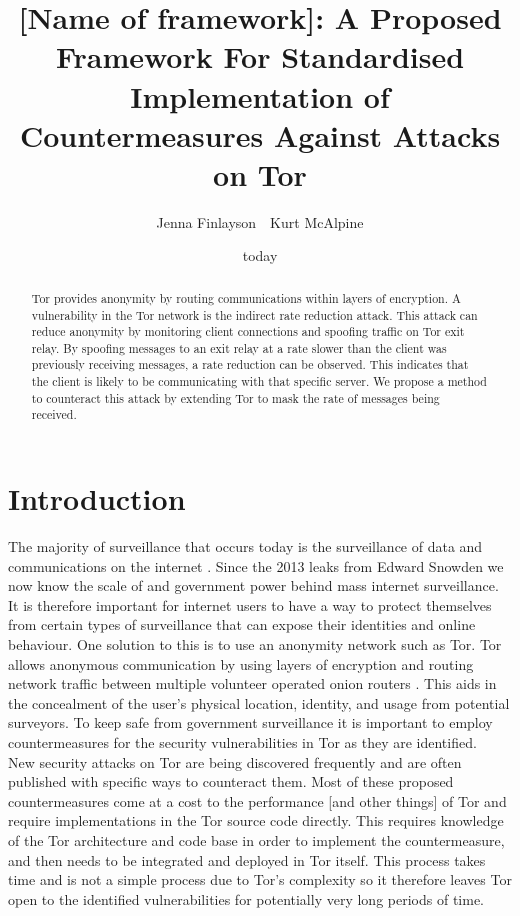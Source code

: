 \documentclass[9pt,technote]{IEEEtran}
\title{[Name of framework]: A Proposed Framework For Standardised Implementation of Countermeasures Against Attacks on Tor}
\date{today}
\author{Jenna Finlayson~~Kurt McAlpine}
\begin{document}
 
\maketitle

\begin{abstract} Tor provides anonymity by routing communications within layers
of encryption. A vulnerability in the Tor network is the indirect rate reduction
attack. This attack can reduce anonymity by monitoring client connections and
spoofing traffic on Tor exit relay. By spoofing messages to an exit relay at a
rate slower than the client was previously receiving messages, a rate reduction
can be observed. This indicates that the client is likely to be communicating
with that specific server. We propose a method to counteract this attack by
extending Tor to mask the rate of messages being received. \end{abstract}

\section{Introduction} 
The majority of surveillance that occurs today is the
surveillance of data and communications on the internet
\cite{diffie2008brave}. Since the 2013 leaks from Edward Snowden we now know the scale of and government power behind mass internet
surveillance. It is therefore important for internet users to have a way to
protect themselves from certain types of surveillance that can expose their identities and online behaviour. One solution to this is to use an anonymity network such as Tor. Tor allows anonymous communication by using layers of encryption and routing network
traffic between multiple volunteer operated onion routers \cite{tor}. This aids in the concealment of the
user's physical location, identity, and usage from potential surveyors. To keep
safe from government surveillance it is important to employ countermeasures for the security
vulnerabilities in Tor as they are identified.\\

New security attacks on Tor are being discovered frequently and are often published with specific ways to counteract them. Most of these proposed countermeasures come at a cost to the performance [and other things] of Tor and require implementations in the Tor source code directly. This requires knowledge of the Tor architecture and code base in order to implement the countermeasure, and then needs to be integrated and deployed in Tor itself. This process takes time and is not a simple process due to Tor's complexity so it therefore leaves Tor open to the identified vulnerabilities for potentially very long periods of time. \\
\end{document}
